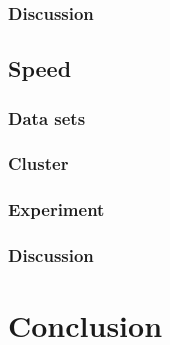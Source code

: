 \documentclass{article}
\begin{document}
\subsubsection{Discussion}

\subsection{Speed}

\subsubsection{Data sets}

\subsubsection{Cluster}

\subsubsection{Experiment}

\subsubsection{Discussion}

\section{Conclusion}
\end{document}
